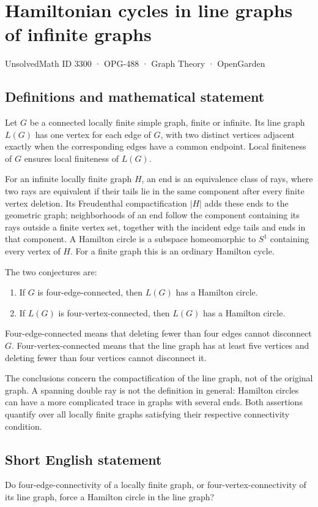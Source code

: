 \documentclass[11pt,a4paper]{article}
\begin{document}
\section*{Hamiltonian cycles in line graphs of infinite graphs}\label{3300}
{\small UnsolvedMath ID 3300 · OPG-488 · Graph Theory · OpenGarden}
\subsection{Definitions and mathematical statement}
Let $G$ be a connected locally finite simple graph, finite or infinite. Its line graph $L(G)$ has one vertex for each edge of $G$, with two distinct vertices adjacent exactly when the corresponding edges have a common endpoint. Local finiteness of $G$ ensures local finiteness of $L(G)$.

For an infinite locally finite graph $H$, an end is an equivalence class of rays, where two rays are equivalent if their tails lie in the same component after every finite vertex deletion. Its Freudenthal compactification $|H|$ adds these ends to the geometric graph; neighborhoods of an end follow the component containing its rays outside a finite vertex set, together with the incident edge tails and ends in that component. A Hamilton circle is a subspace homeomorphic to $S^1$ containing every vertex of $H$. For a finite graph this is an ordinary Hamilton cycle.

The two conjectures are:
\begin{enumerate}
\item If $G$ is four-edge-connected, then $L(G)$ has a Hamilton circle.
\item If $L(G)$ is four-vertex-connected, then $L(G)$ has a Hamilton circle.
\end{enumerate}
Four-edge-connected means that deleting fewer than four edges cannot disconnect $G$. Four-vertex-connected means that the line graph has at least five vertices and deleting fewer than four vertices cannot disconnect it.

The conclusions concern the compactification of the line graph, not of the original graph. A spanning double ray is not the definition in general: Hamilton circles can have a more complicated trace in graphs with several ends. Both assertions quantify over all locally finite graphs satisfying their respective connectivity condition.
\subsection{Short English statement}
Do four-edge-connectivity of a locally finite graph, or four-vertex-connectivity of its line graph, force a Hamilton circle in the line graph?
\end{document}

